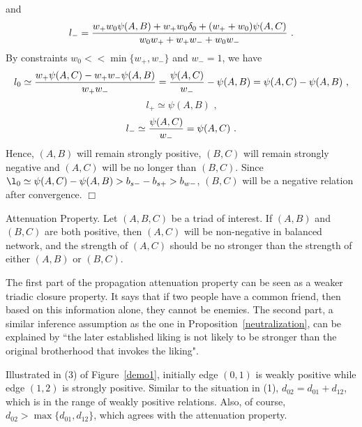 and
\[
{l_{-}}={{w_{+}w_{0}\psi(A,B)+w_{+}w_{0}\delta_{0}+(w_{+}+w_{0})\psi(A,C)} \over {w_{0}w_{+}+w_{+}w_{-}+w_{0}w_{-}}}\text{ .}
\]
By constraints $w_{0}<<\min{\{w_{+},w_{-}\}}$  and $w_{-}=1$, we have
\[
{l_{0}} \simeq {{w_{+}\psi(A,C) - w_{+}w_{-}\psi(A,B)} \over {w_{+}w_{-}}} = {\psi(A,C) \over {w_{-}}} - \psi(A,B)=\psi(A,C)-\psi(A,B)\text{ ,}
\]
\[
{l_{+}} \simeq \psi(A,B) \text{ ,}
\]
\[
{l_{-}} \simeq {\psi(A,C) \over {w_{-}}}=\psi(A,C) \text{ .}
\]
Hence, $(A, B)$ will remain strongly positive, $(B,C)$ will remain strongly negative and $(A,C)$ will be no longer than $(B,C)$. Since $\l_{0} \simeq \psi(A,C) - \psi(A,B) >b_{s-}-b_{s+}>b_{w-}$, $(B,C)$ will be a negative relation after convergence. $\Box$\\


\begin{proposition}\label{attenuation}
Attenuation Property. Let $(A,B,C)$ be a triad of interest. If $(A,B)$ and $(B,C)$ are both positive, then $(A,C)$ will be non-negative in balanced network, and the strength of $(A,C)$ should be no stronger than the strength of either $(A,B)$ or $(B,C)$.
\end{proposition}
The first part of the propagation attenuation property can be seen as a weaker triadic closure property. It says that if two people have a common friend, then based on this information alone, they cannot be enemies. The second part, a similar inference assumption as the one in Proposition~\ref{neutralization}, can be explained by ``the later established liking is not likely to be stronger than the original brotherhood that invokes the liking". 

Illustrated in (3) of Figure~\ref{demo1}, initially edge $(0,1)$ is weakly positive while edge $(1,2)$ is strongly positive. Similar to the situation in (1), $d_{02}=d_{01}+d_{12}$, which is in the range of weakly positive relations. Also, of course, $d_{02}>\max {\{d_{01}, d_{12}\}}$, which agrees with the attenuation property.

